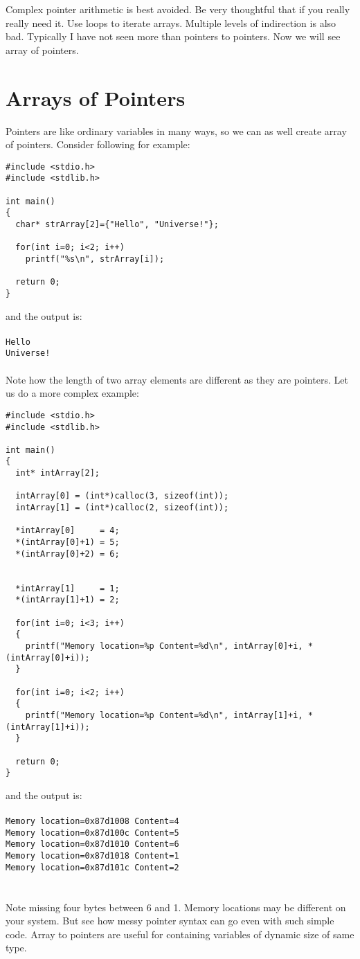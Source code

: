 Complex pointer arithmetic is best avoided. Be very thoughtful that if you
really really need it. Use loops to iterate arrays. Multiple levels of
indirection is also bad. Typically I have not seen more than pointers to
pointers. Now we will see array of pointers.

\section{Arrays of Pointers}
Pointers are like ordinary variables in many ways, so we can as well create
array of pointers. Consider following for example:

\begin{verbatim}
#include <stdio.h>
#include <stdlib.h>

int main()
{
  char* strArray[2]={"Hello", "Universe!"};

  for(int i=0; i<2; i++)
    printf("%s\n", strArray[i]);

  return 0;
}
\end{verbatim}
and the output is:
\\\\\texttt{Hello\\
Universe!\\\\}
Note how the length of two array elements are different as they are
pointers. Let us do a more complex example:

\begin{verbatim}
#include <stdio.h>
#include <stdlib.h>

int main()
{
  int* intArray[2];

  intArray[0] = (int*)calloc(3, sizeof(int));
  intArray[1] = (int*)calloc(2, sizeof(int));

  *intArray[0]     = 4;
  *(intArray[0]+1) = 5;
  *(intArray[0]+2) = 6;


  *intArray[1]     = 1;
  *(intArray[1]+1) = 2;

  for(int i=0; i<3; i++)
  {
    printf("Memory location=%p Content=%d\n", intArray[0]+i, *(intArray[0]+i));
  }

  for(int i=0; i<2; i++)
  {
    printf("Memory location=%p Content=%d\n", intArray[1]+i, *(intArray[1]+i));
  }

  return 0;
}
\end{verbatim}
and the output is:
\\\\\texttt{Memory location=0x87d1008 Content=4\\
Memory location=0x87d100c Content=5\\
Memory location=0x87d1010 Content=6\\
Memory location=0x87d1018 Content=1\\
Memory location=0x87d101c Content=2\\\\\\}
Note missing four bytes between 6 and 1. Memory locations may be different on
your system. But see how messy pointer syntax can go even with such simple
code. Array to pointers are useful for containing variables of dynamic size of
same type.

